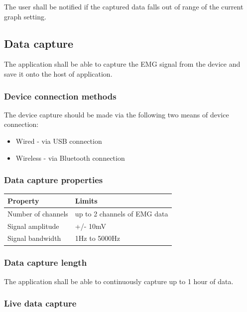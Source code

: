 \documentclass[12pt,a4paper]{article}
\begin{document}
The user shall be notified if the captured data falls out of range of the current graph setting.

\subsection{Data capture}

The application shall be able to capture the EMG signal from the device and save it onto the host of application.

\subsubsection{Device connection methods}

The device capture should be made via the following two means of device connection:

\begin{itemize}
	\item Wired - via USB connection
	\item Wireless - via Bluetooth connection
\end{itemize}

\subsubsection{Data capture properties}

\begin{table}[htbp]
	\centering
	
	\begin{tabular}{|l|l|}
		\hline
		\textbf{Property}  & \textbf{Limits} \\
		\hline
		Number of channels & up to 2 channels of EMG data\\
		\hline
		Signal amplitude & +/- 10mV \\
		\hline
		Signal bandwidth & 1Hz to 5000Hz \\
		\hline
	\end{tabular}
\end{table}

\subsubsection{Data capture length}

The application shall be able to continuously capture up to 1 hour of data.

\subsubsection{Live data capture}
\end{document}

